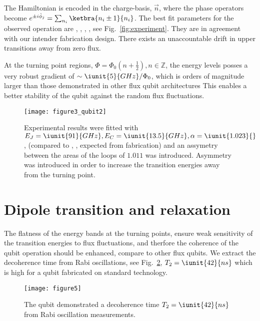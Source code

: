  \noindent The Hamiltonian is encoded in the charge-basis, $ \vec{n} $, where the phase operators become $ e^{\pm i\hat{\phi}_j} = \sum_{n_i}\ketbra{n_i\pm1}{n_i}$. The best fit parameters for the observed operation are , , , , see Fig.~\ref{fig:experiment}. They are in agreement with our intender fabrication design. There exists an unaccountable drift in upper \ira{} transitions away from zero flux.
  
 At the turning point regions, $ \Phi = \Phi_0(n+\frac{1}{2}), n \in \mathbb{Z} $, the energy levels posses a very robust gradient of $ \sim \iunit{5}{GHz}/\Phi_0 $, which is  orders of magnitude larger than those demonstrated in other flux qubit architectures  This enables a better stability of the qubit against the random flux fluctuations.
 
 \begin{figure}[h!]
 	\texttt{[image: figure3\_qubit2]}
 	\caption{Experimental results were fitted with $ E_J = \iunit{91}{GHz}, E_C = \iunit{13.5}{GHz}, \alpha = \iunit{1.023}{} $, (compared to , ,  expected from fabrication) and an assymetry between the areas of the loops of $ 1.011 $ was introduced. Asymmetry was introduced in order to increase the transition energies away from the turning point. \label{fig:simulation}}
 \end{figure}

\section{Dipole transition and relaxation}
 The flatness of the energy bands at the turning points, ensure weak sensitivity of the transition energies to flux fluctuations, and therfore the coherence of the qubit operation should be enhanced, compare to other flux qubits. We extract the decoherence time from Rabi oscillations, see Fig.~\ref{fig:rabi}, $ T_2 = \iunit{42}{ns} $ which is high for a qubit fabricated on standard technology.  

 \begin{figure}[h!]
 	\texttt{[image: figure5]}
 	\caption{The qubit demonstrated a decoherence time $ T_2 = \iunit{42}{ns} $ from Rabi oscillation measurements. \label{fig:rabi}}
 \end{figure}

